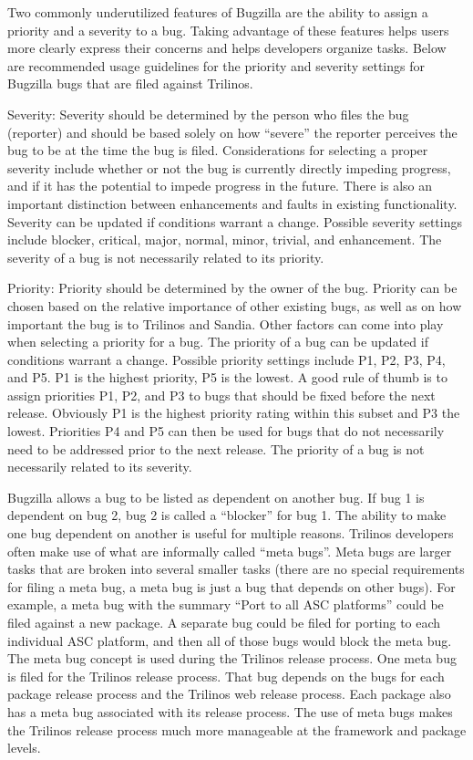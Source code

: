 \documentclass[12pt,relax]{TrilinosDevGuide}
\begin{document}
Two commonly underutilized features of Bugzilla are the ability to assign a 
priority and a severity to a bug.  Taking advantage of these features helps 
users more clearly express their concerns and helps developers organize tasks.
Below are recommended usage guidelines for the priority and severity settings 
for Bugzilla bugs that are filed against Trilinos.

Severity: Severity should be determined by the person who files the bug 
(reporter) and should be based solely on how “severe” the reporter perceives 
the bug to be at the time the bug is filed.  Considerations for selecting a 
proper severity include whether or not the bug is currently directly impeding 
progress, and if it has the potential to impede progress in the future.  There 
is also an important distinction between enhancements and faults in existing 
functionality.  Severity can be updated if conditions warrant a change.  
Possible severity settings include blocker, critical, major, normal, minor, 
trivial, and enhancement.  The severity of a bug is not necessarily related to 
its priority. 

Priority: Priority should be determined by the owner of the bug.  Priority can 
be chosen based on the relative importance of other existing bugs, as well as 
on how important the bug is to Trilinos and Sandia.  Other factors can come 
into play when selecting a priority for a bug.  The priority of a bug can be 
updated if conditions warrant a change.  Possible priority settings include P1, 
P2, P3, P4, and P5.  P1 is the highest priority, P5 is the lowest.  A good rule 
of thumb is to assign priorities P1, P2, and P3 to bugs that should be fixed 
before the next release.  Obviously P1 is the highest priority rating within 
this subset and P3 the lowest.  Priorities P4 and P5 can then be used for bugs 
that do not necessarily need to be addressed prior to the next release.  
The priority of a bug is not necessarily related to its severity.

Bugzilla allows a bug to be listed as dependent on another bug.  If bug 1 is 
dependent on bug 2, bug 2 is called a ``blocker'' for bug 1.  The ability to 
make one bug dependent on another is useful for multiple reasons.  Trilinos 
developers often make use of what are informally called ``meta bugs''.  Meta 
bugs are larger tasks that are broken into several smaller tasks (there are no 
special requirements for filing a meta bug, a meta bug is just a bug that 
depends on other bugs).  For example, a meta bug with the summary ``Port to 
all ASC platforms'' could be filed against a new package.  A separate bug 
could be filed for porting to each individual ASC platform, and then all of 
those bugs would block the meta bug.  The meta bug concept is used during the 
Trilinos release process.  One meta bug is filed for the Trilinos release 
process.  That bug depends on the bugs for each package release process and the 
Trilinos web release process.  Each package also has a meta bug associated with 
its release process.  The use of meta bugs makes the Trilinos release process 
much more manageable at the framework and package levels.
\end{document}
